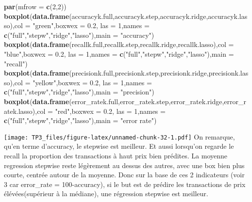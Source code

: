 \documentclass[
]{article}
\newenvironment{Shaded}{\begin{snugshade}}{\end{snugshade}}
\newcommand{\DataTypeTok}[1]{\textcolor[rgb]{0.13,0.29,0.53}{#1}}
\newcommand{\DecValTok}[1]{\textcolor[rgb]{0.00,0.00,0.81}{#1}}
\newcommand{\FloatTok}[1]{\textcolor[rgb]{0.00,0.00,0.81}{#1}}
\newcommand{\KeywordTok}[1]{\textcolor[rgb]{0.13,0.29,0.53}{\textbf{#1}}}
\newcommand{\NormalTok}[1]{#1}
\newcommand{\StringTok}[1]{\textcolor[rgb]{0.31,0.60,0.02}{#1}}
\begin{document}
\begin{Shaded}
\begin{Highlighting}[]
\KeywordTok{par}\NormalTok{(}\DataTypeTok{mfrow =} \KeywordTok{c}\NormalTok{(}\DecValTok{2}\NormalTok{,}\DecValTok{2}\NormalTok{))}
\KeywordTok{boxplot}\NormalTok{(}\KeywordTok{data.frame}\NormalTok{(accuracyk.full,accuracyk.step,accuracyk.ridge,accuracyk.lasso),}\DataTypeTok{col =} \StringTok{"green"}\NormalTok{,}\DataTypeTok{boxwex =} \FloatTok{0.2}\NormalTok{, }\DataTypeTok{las =} \DecValTok{1}\NormalTok{,}\DataTypeTok{names =} \KeywordTok{c}\NormalTok{(}\StringTok{"full"}\NormalTok{,}\StringTok{"stepw"}\NormalTok{,}\StringTok{"ridge"}\NormalTok{,}\StringTok{"lasso"}\NormalTok{),}\DataTypeTok{main =} \StringTok{"accuracy"}\NormalTok{)}
\KeywordTok{boxplot}\NormalTok{(}\KeywordTok{data.frame}\NormalTok{(recallk.full,recallk.step,recallk.ridge,recallk.lasso),}\DataTypeTok{col =} \StringTok{"blue"}\NormalTok{,}\DataTypeTok{boxwex =} \FloatTok{0.2}\NormalTok{, }\DataTypeTok{las =} \DecValTok{1}\NormalTok{,}\DataTypeTok{names =} \KeywordTok{c}\NormalTok{(}\StringTok{"full"}\NormalTok{,}\StringTok{"stepw"}\NormalTok{,}\StringTok{"ridge"}\NormalTok{,}\StringTok{"lasso"}\NormalTok{),}\DataTypeTok{main =} \StringTok{"recall"}\NormalTok{)}
\KeywordTok{boxplot}\NormalTok{(}\KeywordTok{data.frame}\NormalTok{(precisionk.full,precisionk.step,precisionk.ridge,precisionk.lasso),}\DataTypeTok{col =} \StringTok{"yellow"}\NormalTok{,}\DataTypeTok{boxwex =} \FloatTok{0.2}\NormalTok{, }\DataTypeTok{las =} \DecValTok{1}\NormalTok{,}\DataTypeTok{names =} \KeywordTok{c}\NormalTok{(}\StringTok{"full"}\NormalTok{,}\StringTok{"stepw"}\NormalTok{,}\StringTok{"ridge"}\NormalTok{,}\StringTok{"lasso"}\NormalTok{),}\DataTypeTok{main =} \StringTok{"precision"}\NormalTok{)}
\KeywordTok{boxplot}\NormalTok{(}\KeywordTok{data.frame}\NormalTok{(error_ratek.full,error_ratek.step,error_ratek.ridge,error_ratek.lasso),}\DataTypeTok{col =} \StringTok{"red"}\NormalTok{,}\DataTypeTok{boxwex =} \FloatTok{0.2}\NormalTok{, }\DataTypeTok{las =} \DecValTok{1}\NormalTok{,}\DataTypeTok{names =} \KeywordTok{c}\NormalTok{(}\StringTok{"full"}\NormalTok{,}\StringTok{"stepw"}\NormalTok{,}\StringTok{"ridge"}\NormalTok{,}\StringTok{"lasso"}\NormalTok{),}\DataTypeTok{main =} \StringTok{"error rate"}\NormalTok{)}
\end{Highlighting}
\end{Shaded}

\texttt{[image: TP3\_files/figure-latex/unnamed-chunk-32-1.pdf]} On
remarque, qu'en terme d'accuracy, le stepwise est meilleur. Et aussi
lorsqu'on regarde le recall la proportion des transactions à haut prix
bien prédites. La moyenne regression stepwise reste légèrement au dessus
des autres, avec une box bien plus courte, centrée autour de la moyenne.
Donc sur la base de ces 2 indicateurs (voir 3 car error\_rate =
100-accuracy), si le but est de prédire les transactions de prix
élévées(supérieur à la médiane), une régression stepwise est meilleur.
\end{document}
